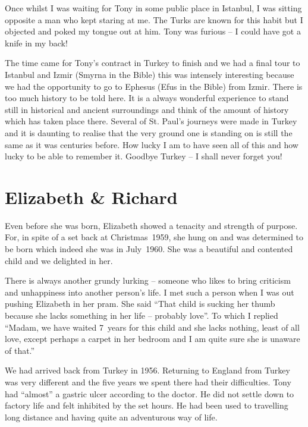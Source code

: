 Once whilst I was waiting for Tony in some public place in Istanbul, I
was sitting opposite a man who kept staring at me. The Turks are known
for this habit but I objected and poked my tongue out at him. Tony was
furious -- I could have got a knife in my back!

The time came for Tony's contract in Turkey to finish and we had a
final tour to Istanbul and Izmir (Smyrna in the Bible) this was
intensely interesting because we had the opportunity to go to Ephesus
(Efus in the Bible) from Izmir. There is too much history to be told
here. It is a always wonderful experience to stand still in historical
and ancient surroundings and think of the amount of history which has
taken place there. Several of St. Paul’s journeys were made in Turkey
and it is daunting to realise that the very ground one is standing on
is still the same as it was centuries before. How lucky I am to have
seen all of this and how lucky to be able to remember it. Goodbye
Turkey -- I shall never forget you!


\chapter{Elizabeth \& Richard}

Even before she was born, Elizabeth showed a tenacity and strength of
purpose. For, in spite of a set back at Christmas~1959, she hung on
and was determined to be born which indeed she was in July~1960. She
was a beautiful and contented child and we delighted in her.

There is always another grundy lurking -- someone who likes to bring
criticism and unhappiness into another person's life. I met such a
person when I was out pushing Elizabeth in her pram. She said ``That
child is sucking her thumb because she lacks something in her life --
probably love''. To which I replied ``Madam, we have waited 7~years
for this child and she lacks nothing, least of all love, except
perhaps a carpet in her bedroom and I am quite sure she is unaware of
that.''


We had arrived back from Turkey in 1956. Returning to England from
Turkey was very different and the five years we spent there had their
difficulties. Tony had ``almost'' a gastric ulcer according to the
doctor. He did not settle down to factory life and felt inhibited by
the set hours. He had been used to travelling long distance and having
quite an adventurous way of life.

